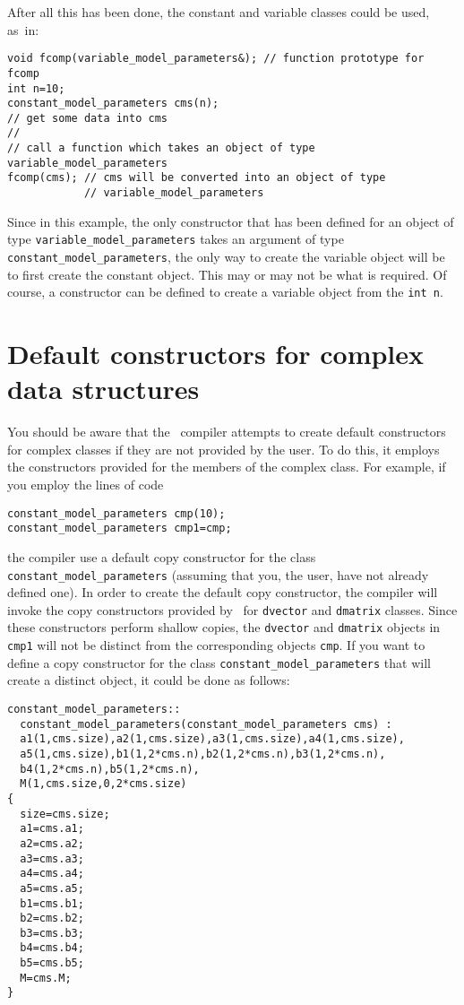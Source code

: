 \documentclass{admbmanual}
\begin{document}
After all this has been done, the constant and variable classes could be 
used, as~in:
\begin{lstlisting}
void fcomp(variable_model_parameters&); // function prototype for fcomp
int n=10;
constant_model_parameters cms(n);
// get some data into cms
//
// call a function which takes an object of type variable_model_parameters
fcomp(cms); // cms will be converted into an object of type
            // variable_model_parameters
\end{lstlisting}
Since in this example, the only constructor that has been
defined for an object of type 
\texttt{variable\_model\_parameters} takes an argument of type
\texttt{constant\_model\_parameters}, the only way to create the variable object
will be to first create the constant object. This may or may not be
what is required. Of course, a constructor  can
be defined to create a variable object  from the \texttt{int n}.


\section{Default constructors for complex data structures}

You should be aware that the \cplus\ compiler attempts to 
create default constructors for complex classes if they are not provided by the
user. To do this, it employs the constructors provided for the members of 
the complex class. For example, if you employ the lines of code
\begin{lstlisting}
constant_model_parameters cmp(10);
constant_model_parameters cmp1=cmp;
\end{lstlisting}
the compiler use a default copy constructor
for the class 
\texttt{constant\_model\_parameters} (assuming that you,
the user, have not already defined one).
In order to create the default copy constructor, the compiler will invoke the 
copy constructors provided by \scAD\ for \texttt{dvector} and
\texttt{dmatrix} classes. Since these constructors perform
shallow copies, the \texttt{dvector} and \texttt{dmatrix} 
objects in  \texttt{cmp1} will not be distinct from the corresponding
objects \texttt{cmp}. If you want to define a copy constructor for
the class \texttt{constant\_model\_parameters} that will create
a distinct object, it could be done as follows:
\begin{lstlisting}
constant_model_parameters::
  constant_model_parameters(constant_model_parameters cms) :
  a1(1,cms.size),a2(1,cms.size),a3(1,cms.size),a4(1,cms.size),
  a5(1,cms.size),b1(1,2*cms.n),b2(1,2*cms.n),b3(1,2*cms.n),
  b4(1,2*cms.n),b5(1,2*cms.n), 
  M(1,cms.size,0,2*cms.size) 
{
  size=cms.size;
  a1=cms.a1; 
  a2=cms.a2; 
  a3=cms.a3; 
  a4=cms.a4; 
  a5=cms.a5; 
  b1=cms.b1; 
  b2=cms.b2; 
  b3=cms.b3; 
  b4=cms.b4; 
  b5=cms.b5; 
  M=cms.M;
}
\end{lstlisting}
\end{document}
